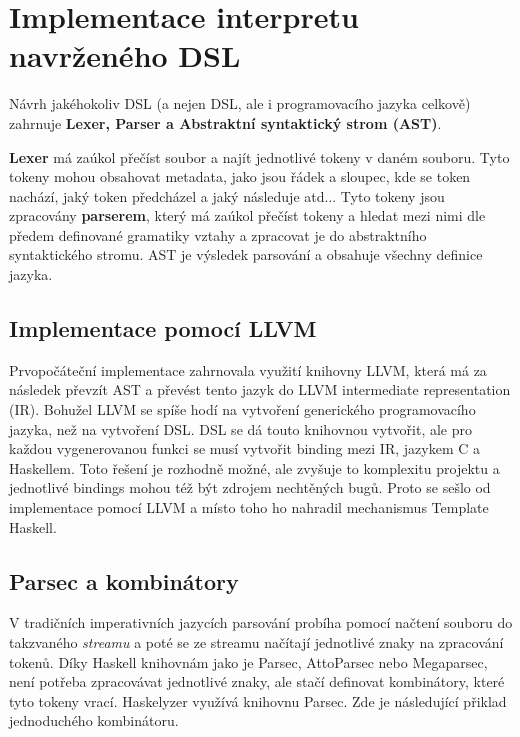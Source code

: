 \documentclass[male,czech]{kithesis}
\begin{document}

\chapter{Implementace interpretu navrženého DSL}

Návrh jakéhokoliv DSL (a nejen DSL, ale i programovacího jazyka celkově) zahrnuje
\textbf{Lexer, Parser a Abstraktní syntaktický strom (AST)}.

\textbf{Lexer} má zaúkol přečíst soubor a najít jednotlivé tokeny v daném souboru.
Tyto tokeny mohou obsahovat metadata, jako jsou řádek a sloupec, kde se token nachází,
jaký token předcházel a jaký následuje atd... Tyto tokeny jsou zpracovány \textbf{parserem}, 
který má zaúkol přečíst tokeny a hledat mezi nimi dle předem definované gramatiky vztahy 
a zpracovat je do abstraktního syntaktického stromu. AST je výsledek
parsování a obsahuje všechny definice jazyka.

\section{Implementace pomocí LLVM}

Prvopočáteční implementace zahrnovala využití knihovny LLVM, která 
má za následek převzít AST a převést tento jazyk do LLVM intermediate representation (IR).
Bohužel LLVM se spíše hodí na vytvoření generického programovacího jazyka, než na vytvoření
DSL. DSL se dá touto knihovnou vytvořit, ale pro každou vygenerovanou funkci se musí
vytvořit binding mezi IR, jazykem C a Haskellem. Toto řešení je rozhodně možné, 
ale zvyšuje to komplexitu projektu a jednotlivé bindings mohou též být zdrojem 
nechtěných bugů. Proto se sešlo od implementace pomocí LLVM a místo toho ho nahradil 
mechanismus Template Haskell.

\section{Parsec a kombinátory}

V tradičních imperativních jazycích parsování probíha pomocí načtení souboru 
do takzvaného \textit{streamu} a poté se ze streamu načítají jednotlivé znaky 
na zpracování tokenů. Díky Haskell knihovnám jako je Parsec, AttoParsec nebo Megaparsec,
není potřeba zpracovávat jednotlivé znaky, ale stačí definovat kombinátory, 
které tyto tokeny vrací. Haskelyzer využívá knihovnu Parsec. Zde je následující přiklad 
jednoduchého kombinátoru.
\end{document}
